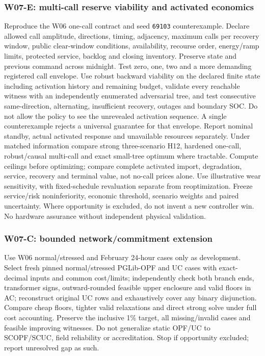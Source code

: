 \documentclass[11pt,letterpaper]{article}
\begin{document}
\subsubsection{W07-E: multi-call reserve viability and activated economics}
Reproduce the W06 one-call contract and seed \texttt{69103} counterexample. Declare allowed call amplitude, directions, timing, adjacency, maximum calls per recovery window, public clear-window conditions, availability, recourse order, energy/ramp limits, protected service, backlog and closing inventory. Preserve state and previous command across midnight. Test zero, one, two and a more demanding registered call envelope. Use robust backward viability on the declared finite state including activation history and remaining budget, validate every reachable witness with an independently enumerated adversarial tree, and test consecutive same-direction, alternating, insufficient recovery, outages and boundary SOC. Do not allow the policy to see the unrevealed activation sequence. A single counterexample rejects a universal guarantee for that envelope. Report nominal standby, actual activated response and unavailable resources separately. Under matched information compare strong three-scenario H12, hardened one-call, robust/causal multi-call and exact small-tree optimum where tractable. Compute ceilings before optimizing; compare complete activated import, degradation, service, recovery and terminal value, not no-call prices alone. Use illustrative wear sensitivity, with fixed-schedule revaluation separate from reoptimization. Freeze service/risk noninferiority, economic threshold, scenario weights and paired uncertainty. Where opportunity is excluded, do not invent a new controller win. No hardware assurance without independent physical validation.

\subsubsection{W07-C: bounded network/commitment extension}
Use W06 normal/stressed and February 24-hour cases only as development. Select fresh pinned normal/stressed PGLib-OPF and UC cases with exact-decimal inputs and common cost/limits; independently check both branch ends, transformer signs, outward-rounded feasible upper enclosure and valid floors in AC; reconstruct original UC rows and exhaustively cover any binary disjunction. Compare cheap floors, tighter valid relaxations and direct strong solve under full cost accounting. Preserve the inclusive 1\% target, all missing/invalid cases and feasible improving witnesses. Do not generalize static OPF/UC to SCOPF/SCUC, field reliability or accreditation. Stop if opportunity excluded; report unresolved gap as such.
\end{document}
